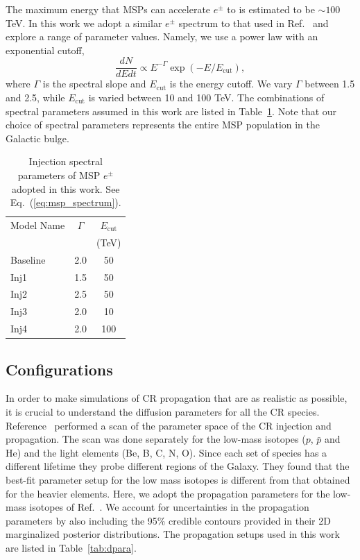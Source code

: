 \documentclass[%
reprint,
superscriptaddress,
amsmath,amssymb,
aps,
floatfix,
]{revtex4-1}
\begin{document}
The maximum energy that MSPs can accelerate $e^{\pm}$ to is estimated to be $\sim 100$ TeV. In this work we adopt a similar $e^\pm$ spectrum to that used in Ref.~\cite{Yuan:2014yda} and explore a range of parameter values. Namely, we use a power law with an exponential cutoff,
\begin{equation}
  \label{eq:msp_spectrum}
  \dfrac{dN}{dEdt} \propto E^{-\Gamma}\exp(-E/E_{\text{cut}}),
\end{equation}
where $\Gamma$ is the spectral slope and $E_{\text{cut}}$ is the energy cutoff. We vary $\Gamma$ between 1.5 and 2.5, while $E_{\text{cut}}$ is varied between 10 and 100 TeV. The combinations of spectral parameters assumed in this work are listed in Table~\ref{tab:msp_spectrum}. Note that our choice of spectral parameters represents the entire MSP population in the Galactic bulge.
\begin{table}[t!]
  \centering
  \caption{Injection spectral parameters of MSP $e^{\pm}$ adopted in this work. See Eq.~(\ref{eq:msp_spectrum}).}
    \begin{tabular}{lcc}\hline\hline
    Model Name&$\Gamma$ & $E_{\text{cut}}$\\
    & &  (TeV) \\\hline
    Baseline &2.0 & 50 \\
    Inj1&1.5 & 50 \\
    Inj2&2.5 & 50 \\
    Inj3&2.0 & 10 \\
    Inj4&2.0 & 100\\\hline\hline
    \end{tabular}
  \label{tab:msp_spectrum}
\end{table}

\subsection{Configurations}

In order to make simulations of CR propagation that are as realistic as possible, it is crucial to understand the diffusion parameters for all the CR species. Reference~\cite{Johannesson:2016rlh} performed a scan of the parameter space of the CR injection and propagation. The scan was done separately for the low-mass isotopes ($p$, $\bar{p}$ and He) and the light elements (Be, B, C, N, O). Since each set of species has a different lifetime they probe different regions of the Galaxy. They found that the best-fit parameter setup for the low mass isotopes is different from that obtained for the heavier elements. Here, we adopt the propagation parameters for the low-mass isotopes of Ref.~\cite{Johannesson:2016rlh}. We account for uncertainties in the propagation parameters by also including the 95\% credible contours provided in their 2D marginalized posterior distributions. The propagation setups used in this work are listed in Table~\ref{tab:dpara}.
\end{document}
